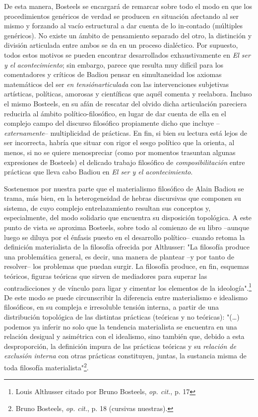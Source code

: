 De esta manera, Bosteels se encargará de remarcar sobre todo el modo en
que los procedimientos genéricos de verdad se producen \emph{en}
situación afectando al ser mismo y forzando al vacío estructural a dar
cuenta de lo in-contado (múltiples genéricos). No existe un ámbito de
pensamiento separado del otro, la distinción y división articulada entre
ambos se da en un proceso dialéctico. Por supuesto, todos estos motivos
se pueden encontrar desarrollados exhaustivamente en \emph{El ser y el
acontecimiento}; sin embargo, parece que resulta muy difícil para los
comentadores y críticos de Badiou pensar en simultaneidad los axiomas
matemáticos del ser \emph{en tensiónarticulada} con las intervenciones
subjetivas artísticas, políticas, amorosas y científicas que aquél
comenta y reelabora. Incluso el mismo Bosteels, en su afán de rescatar
del olvido dicha articulación pareciera reducirla al ámbito
político-filosófico, en lugar de dar cuenta de ella en el complejo campo
del discurso filosófico propiamente dicho que incluye
--\emph{externamente}-- multiplicidad de prácticas. En fin, si bien su
lectura está lejos de ser incorrecta, habría que situar con rigor el
sesgo político que la orienta, al menos, si no se quiere menospreciar
(como por momentos trasuntan algunas expresiones de Bosteels) el
delicado trabajo filosófico de \emph{composibilitación} entre prácticas
que lleva cabo Badiou en \emph{El ser y el acontecimiento}.

Sostenemos por nuestra parte que el materialismo filosófico de Alain
Badiou se trama, más bien, en la heterogeneidad de hebras discursivas
que componen su sistema, de cuyo complejo entrelazamiento resultan sus
conceptos y, especialmente, del modo solidario que encuentra su
disposición topológica. A este punto de vista se aproxima Bosteels,
sobre todo al comienzo de su libro --aunque luego se diluya por el
énfasis puesto en el desarrollo político-- cuando retoma la definición
materialista de la filosofía ofrecida por Althusser: "La filosofía
produce una problemática general, es decir, una manera de plantear --y
por tanto de resolver-- los problemas que puedan surgir. La filosofía
produce, en fin, esquemas teóricos, figuras teóricas que sirven de
mediadores para superar las contradicciones y de vínculo para ligar y
cimentar los elementos de la ideología".\footnote{Louis Althusser citado
  por Bruno Bosteels, \emph{op. cit.}, p. 17} De este modo se puede
circunscribir la diferencia entre materialismo e idealismo filosóficos,
en su compleja e irresoluble tensión interna, a partir de una
distribución topológica de las distintas prácticas (teóricas y no
teóricas): "(\dots) podemos ya inferir no solo que la tendencia
materialista se encuentra en una relación desigual y asimétrica con el
idealismo, sino también que, debido a esta desproporción, la definición
impura de las prácticas teóricas y su \emph{relación de exclusión
interna} con otras prácticas constituyen, juntas, la sustancia misma de
toda filosofía materialista"\footnote{Bruno Bosteels, \emph{op. cit.},
  p. 18 (cursivas nuestras).}.

